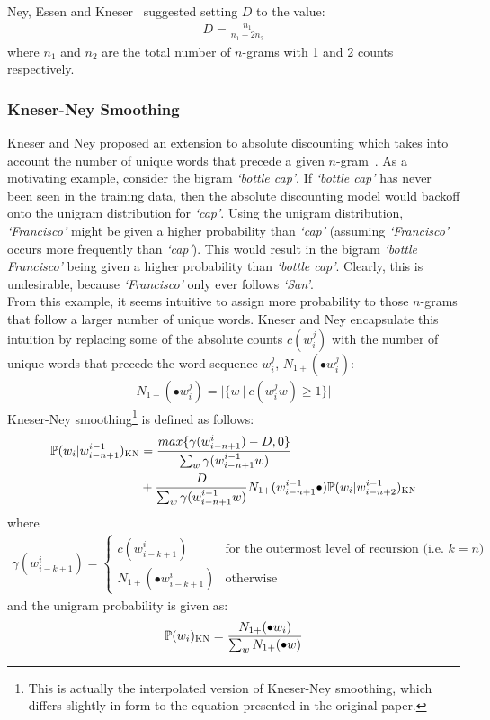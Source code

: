 \documentclass[a4paper, 12pt]{report}
\newcommand{\tit}[1]{\textit{#1}}
\begin{document}
Ney, Essen and Kneser~\cite{absolute_discounting:ney1994} suggested setting $D$ to the value:
\begin{gather} \label{eq:discount}
	D = \frac{n_1}{n_1 + 2n_2}
\end{gather}
where $n_1$ and $n_2$ are the total number of $n$-grams with 1 and 2 counts respectively.

\subsubsection{Kneser-Ney Smoothing}

Kneser and Ney proposed an extension to absolute discounting which takes into account the number of unique words that precede a given $n$-gram~\cite{kneser_ney_smoothing:kneser1995}. As a motivating example, consider the bigram \tit{`bottle cap'}. If \tit{`bottle cap'} has never been seen in the training data, then the absolute discounting model would backoff onto the unigram distribution for \tit{`cap'}. Using the unigram distribution, \tit{`Francisco'} might be given a higher probability than \tit{`cap'} (assuming \tit{`Francisco'} occurs more frequently than \tit{`cap'}). This would result in the bigram \tit{`bottle Francisco'} being given a higher probability than \tit{`bottle cap'}. Clearly, this is undesirable, because \tit{`Francisco'} only ever follows \tit{`San'}. \\

From this example, it seems intuitive to assign more probability to those $n$-grams that follow a larger number of unique words. Kneser and Ney encapsulate this intuition by replacing some of the absolute counts $c(w_i^j)$ with the number of unique words that precede the word sequence $w_i^j$, $N_{1+}(\bullet w_i^j)$:
\begin{gather*}
	N_{1+}(\bullet w_i^j) = |\{w\ |\ c(w_i^jw) \geq 1\}|
\end{gather*}
Kneser-Ney smoothing\footnote{This is actually the interpolated version of Kneser-Ney smoothing, which differs slightly in form to the equation presented in the original paper.} is defined as follows:
\begin{align*}
	\mathbb{P}(w_i | w_{i - n + 1}^{i - 1})_{\text{\scshape KN}} &= \frac{max\{\gamma(w_{i - n + 1}^{i}) - D, 0\}}{\sum_w \gamma(w_{i - n + 1}^{i - 1}w)} \\
	&+ \frac{D}{\sum_w \gamma(w_{i - n + 1}^{i - 1}w)}N_{1+}(w_{i - n + 1}^{i - 1}\bullet)\mathbb{P}(w_i | w_{i - n + 2}^{i - 1})_{\text{\scshape KN}}
\end{align*}
where
\begin{gather} \label{eq:gamma}
	\gamma(w_{i - k + 1}^i) = \begin{cases}
		c(w_{i - k + 1}^i) &\text{for the outermost level of recursion (i.e. $k = n$)} \\
		N_{1+}(\bullet w_{i - k + 1}^i) &\text{otherwise}
	\end{cases}
\end{gather}
and the unigram probability is given as:
\begin{gather*}
	\mathbb{P}(w_i)_{\text{\scshape KN}} = \frac{N_{1+}(\bullet w_i)}{\sum_w N_{1+}(\bullet w)}
\end{gather*}
\end{document}
